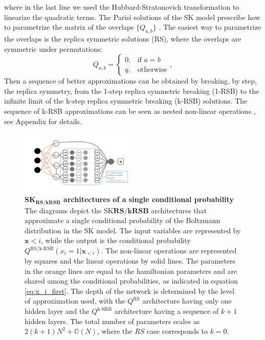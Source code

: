 \documentclass[aps,physrev,10pt,floatfix,reprint]{revtex4-2}
\begin{document}
where in the last line we used the Hubbard-Stratonovich transformation to linearize the quadratic terms. 
The Parisi solutions of the SK model prescribe how to parametrize the matrix of the overlaps $\{Q_{a,b}\}$ \cite{10.1142/0271}. The easiest way to parametrize the overlaps is the replica symmetric solutions (RS), where the overlaps are symmetric under permutations: 
$$
Q_{a,b}=\begin{cases}
			0, & \text{if $a=b$}\\
            q, & \text{otherwise}
		 \end{cases},
$$
Then a sequence of better approximations can be obtained by breaking, by step, the replica symmetry, from the 1-step replica symmetric breaking (1-RSB) to the infinite limit of the k-step replica symmetric breaking (k-RSB) solutions. 
The sequence of k-RSB approximations can be seen as nested non-linear operations \cite{Parisi_1980}, see Appendix for details. 
\begin{figure}[!h]
    \centering 
    \includegraphics[width=0.48\textwidth]{img/SK_arch.pdf}
    \caption{\textbf{SK$\mathbf{_{RS/kRSB}}$ architectures of a single conditional probability} The diagrams depict the SK$\mathbf{{RS/kRSB}}$ architectures that approximate a single conditional probability of the Boltzmann distribution in the SK model. The input variables are represented by $\mathbf{x}{<i}$, while the output is the conditional probability $Q^{\text{RS/k-RSB}}\left(x_{i}=1|\mathbf{x}_{<i}\right)$. The non-linear operations are represented by squares and the linear operations by solid lines. The parameters in the orange lines are equal to the hamiltonian parameters and are shared among the conditional probabilities, as indicated in equation \ref{eq:x_i_first}. The depth of the network is determined by the level of approximation used, with the $Q^{\text{RS}}$ architecture having only one hidden layer and the $Q^{\text{k-SRB}}$ architecture having a sequence of $k+1$ hidden layers. The total number of parameters scales as $2(k+1)N^2 + \mathbb{O}(N)$, where the $RS$ case corresponds to $k=0$.}
    \label{fig:SK_arch}
\end{figure}
\end{document}
